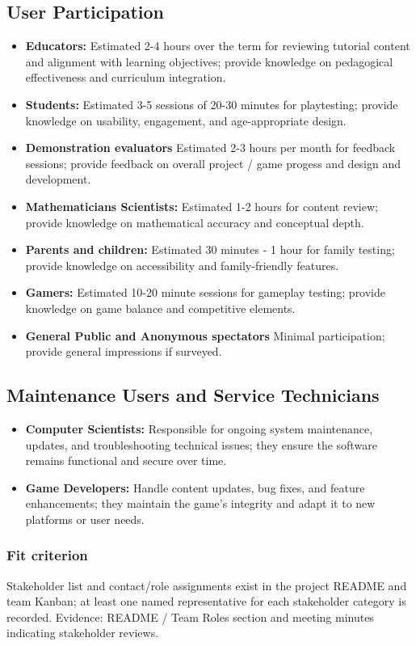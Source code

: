 \documentclass[12pt]{article}
\begin{document}
\subsection{User Participation}
\begin{itemize}
  \item \textbf{Educators:} Estimated 2-4 hours over the term for reviewing tutorial content and alignment with learning objectives; provide knowledge on pedagogical effectiveness and curriculum integration.
  \item \textbf{Students:} Estimated 3-5 sessions of 20-30 minutes for playtesting; provide knowledge on usability, engagement, and age-appropriate design.
  \item \textbf{Demonstration evaluators} Estimated 2-3 hours per month for feedback sessions; provide feedback on overall project / game progess and design and development.
  \item \textbf{Mathematicians Scientists:} Estimated 1-2 hours for content review; provide knowledge on mathematical accuracy and conceptual depth.
  \item \textbf{Parents and children:} Estimated 30 minutes - 1 hour for family testing; provide knowledge on accessibility and family-friendly features.
  \item \textbf{Gamers:} Estimated 10-20 minute sessions for gameplay testing; provide knowledge on game balance and competitive elements.
  \item \textbf{General Public and Anonymous spectators} Minimal participation; provide general impressions if surveyed.
\end{itemize}

\subsection{Maintenance Users and Service Technicians}
\begin{itemize}
  \item \textbf{Computer Scientists:} Responsible for ongoing system maintenance, updates, and troubleshooting technical issues; they ensure the software remains functional and secure over time.
  \item \textbf{Game Developers:} Handle content updates, bug fixes, and feature enhancements; they maintain the game's integrity and adapt it to new platforms or user needs.
\end{itemize}

\subsubsection*{Fit criterion}
Stakeholder list and contact/role assignments exist in the project README and team Kanban; at least one named representative for each stakeholder category is recorded. Evidence: README / Team Roles section and meeting minutes indicating stakeholder reviews.
\end{document}
